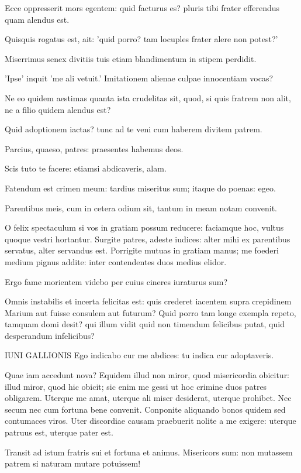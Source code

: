 Ecce oppresserit mors egentem: quid facturus es? pluris tibi frater efferendus quam alendus est. 

Quisquis rogatus est, ait: 'quid porro? tam locuples frater alere non potest?' 

Miserrimus senex divitiis tuis etiam blandimentum in stipem perdidit. 

'Ipse' inquit 'me ali vetuit.' Imitationem alienae culpae innocentiam vocas? 

Ne eo quidem aestimas quanta ista crudelitas sit, quod, si quis fratrem non alit, ne a filio quidem alendus est? 

Quid adoptionem iactas? tunc ad te veni cum haberem divitem patrem. 

Parcius, quaeso, patres: praesentes habemus deos. 

Scis tuto te facere: etiamsi abdicaveris, alam. 

Fatendum est crimen meum: tardius miseritus sum; itaque do poenas: egeo. 

Parentibus meis, cum in cetera odium sit, tantum in meam notam convenit. 

O felix spectaculum si vos in gratiam possum reducere: faciamque hoc, vultus quoque vestri hortantur. Surgite patres, adeste iudices: alter mihi ex parentibus servatus, alter servandus est. Porrigite mutuas in gratiam manus; me foederi medium pignus addite: inter contendentes duos medius elidor. 

Ergo fame morientem videbo per cuius cineres iuraturus sum? 	

Omnis instabilis et incerta felicitas est: quis crederet iacentem supra crepidinem Marium aut fuisse consulem aut futurum? Quid porro tam longe exempla repeto, tamquam domi desit? qui illum vidit quid non timendum felicibus putat, quid desperandum infelicibus?

\bigskip

IUNI GALLIONIS Ego indicabo cur me abdices: tu indica cur adoptaveris. 

Quae iam accedunt nova? Equidem illud non miror, quod misericordia obicitur: illud miror, quod hic obicit; sic enim me gessi ut hoc crimine duos patres obligarem. Uterque me amat, uterque ali miser 	
desiderat, uterque prohibet. Nec secum nec cum fortuna bene convenit. Conponite aliquando bonos quidem sed contumaces viros. Uter discordiae causam praebuerit nolite a me exigere: uterque patruus est, uterque pater est. 

Transit ad istum fratris sui et fortuna et animus. Misericors sum: non mutassem patrem si naturam mutare potuissem! 	

